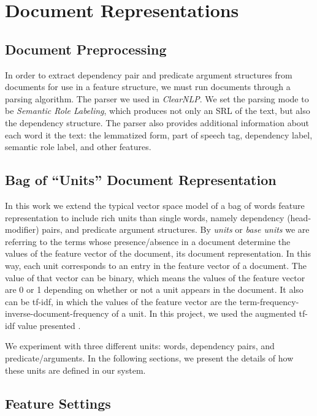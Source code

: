 \documentclass[11pt]{article}
\begin{document}
\section{Document Representations}


\subsection{Document Preprocessing}

In order to extract dependency pair and predicate argument structures from documents for use in a feature structure, we must run documents through a parsing algorithm. The parser we used in \emph{ClearNLP}. We set the parsing mode to be \emph{Semantic Role Labeling}, which produces not only an SRL of the text, but also the dependency structure. The parser also provides additional information about each word it the text: the lemmatized form, part of speech tag, dependency label, semantic role label, and other features. 

\subsection{Bag of ``Units'' Document Representation}

In this work we extend the typical vector space model of a bag of words feature representation to include rich units than single words, namely dependency (head-modifier) pairs, and predicate argument structures. By \emph{units} or \emph{base units} we are referring to the terms whose presence/absence in a document determine the values of the feature vector of the document, its document representation. In this way, each unit corresponds to an entry in the feature vector of a document. The value of that vector can be binary, which means the values of the feature vector are 0 or 1 depending on whether or not a unit appears in the document. It  also can be tf-idf, in which the values of the feature vector are the term-frequency-inverse-document-frequency of a unit. In this project, we used the augmented tf-idf value presented \cite{Polettini2004}.

We experiment with three different units: words, dependency pairs, and predicate/arguments. In the following sections, we present the details of how these units are defined in our system.

\subsection{Feature Settings}
\end{document}
